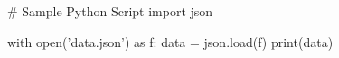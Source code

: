 # Sample Python Script
import json

with open('data.json') as f:
    data = json.load(f)
print(data)